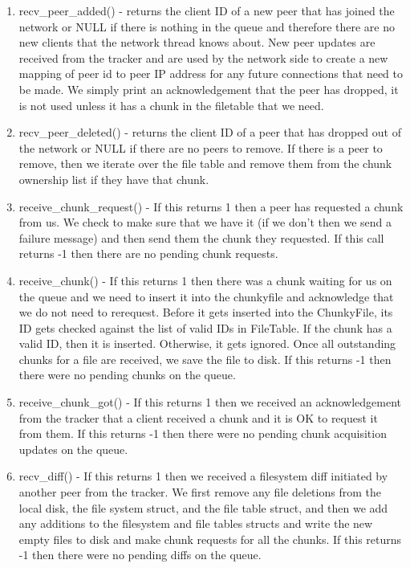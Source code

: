 	\begin{enumerate}
		\item recv_peer_added() - returns the client ID of a new peer that has joined the network or NULL if there is nothing in the queue and therefore there are no new clients that the network thread knows about.  New peer updates are received from the tracker and are used by the network side to create a new mapping of peer id to peer IP address for any future connections that need to be made.  We simply print an acknowledgement that the peer has dropped, it is not used unless it has a chunk in the filetable that we need.
		\item recv_peer_deleted() - returns the client ID of a peer that has dropped out of the network or NULL if there are no peers to remove.  If there is a peer to remove, then we iterate over the file table and remove them from the chunk ownership list if they have that chunk.
		\item receive_chunk_request() - If this returns 1 then a peer has requested a chunk from us.  We check to make sure that we have it (if we don't then we send a failure message) and then send them the chunk they requested.  If this call returns -1 then there are no pending chunk requests.
		\item receive_chunk() - If this returns 1 then there was a chunk waiting for us on the queue and we need to insert it into the chunkyfile and acknowledge that we do not need to rerequest. Before it gets inserted into the ChunkyFile, its ID gets checked against the list of valid IDs in FileTable. If the chunk has a valid ID, then it is inserted. Otherwise, it gets ignored. Once all outstanding chunks for a file are received, we save the file to disk.  If this returns -1 then there were no pending chunks on the queue.
		\item receive_chunk_got() - If this returns 1 then we received an acknowledgement from the tracker that a client received a chunk and it is OK to request it from them.  If this returns -1 then there were no pending chunk acquisition updates on the queue.
		\item recv_diff() - If this returns 1 then we received a filesystem diff initiated by another peer from the tracker.  We first remove any file deletions from the local disk, the file system struct, and the file table struct, and then we add any additions to the filesystem and file tables structs and write the new empty files to disk and make chunk requests for all the chunks.  If this returns -1 then there were no pending diffs on the queue.

\end{enumerate}
